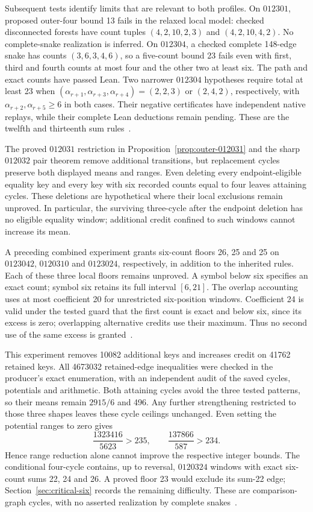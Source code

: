 \documentclass[11pt,a4paper]{article}
\theoremstyle{definition}
\theoremstyle{remark}
\begin{document}
Subsequent tests identify limits that are relevant to both profiles.
On $012301$, proposed outer-four bound 13 fails in the relaxed local model:
checked disconnected forests have count tuples $(4,2,10,2,3)$ and
$(4,2,10,4,2)$. No complete-snake realization is inferred. On $012304$, a
checked complete 148-edge snake has counts $(3,6,3,4,6)$, so a five-count
bound 23 fails even with first, third and fourth counts at most four and
the other two at least six. The path and exact counts have passed Lean.
Two narrower $012304$ hypotheses require total at least 23 when
$(\alpha_{r+1},\alpha_{r+3},\alpha_{r+4})=(2,2,3)$ or $(2,4,2)$,
respectively, with $\alpha_{r+2},\alpha_{r+5}\ge6$ in both cases.
Their negative certificates have independent native replays, while their
complete Lean deductions remain pending. These are the twelfth and
thirteenth sum rules~\cite{latersumarchive}.

The proved $012031$ restriction in Proposition~\ref{prop:outer-012031} and
the sharp $012032$ pair theorem remove additional transitions, but
replacement cycles preserve both displayed means and ranges. Even deleting
every endpoint-eligible equality key and every key with six recorded counts
equal to four leaves attaining cycles. These deletions are hypothetical
where their local exclusions remain unproved. In particular, the surviving
three-cycle after the endpoint deletion has no eligible equality window;
additional credit confined to such windows cannot increase its mean.

A preceding combined experiment grants six-count floors 26, 25 and 25 on
$0123042$, $0120310$ and $0123024$, respectively, in addition to the inherited
rules. Each of these three local floors remains unproved. A symbol below
six specifies an exact count; symbol six retains its full interval
$[6,21]$. The overlap accounting uses at most coefficient 20 for unrestricted
six-position windows. Coefficient 24 is valid under the tested guard that
the first count is exact and below six, since its excess is zero; overlapping
alternative credits use their maximum. Thus no second use of the same
excess is granted~\cite{latersumarchive,uniformsixarchive}.

This experiment removes 10082 additional keys and increases credit on
41762 retained keys. All 4673032 retained-edge inequalities were checked in
the producer's exact enumeration, with an independent audit of the saved
cycles, potentials and arithmetic. Both attaining cycles avoid the three
tested patterns, so their means remain $2915/6$ and 496. Any further
strengthening restricted to those three shapes leaves these cycle ceilings
unchanged. Even setting the potential ranges to zero gives
\[
\frac{1323416}{5623}>235,\qquad
\frac{137866}{587}>234.
\]
Hence range reduction alone cannot improve the respective integer bounds.
The conditional four-cycle contains, up to reversal, $0120324$ windows with
exact six-count sums 22, 24 and 26. A proved floor 23 would exclude its
sum-22 edge; Section~\ref{sec:critical-six} records the remaining difficulty.
These are comparison-graph cycles, with no asserted realization by complete
snakes~\cite{uniformsixarchive,criticalsixarchive}.
\end{document}
